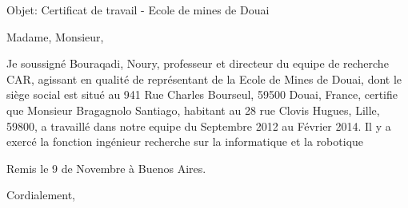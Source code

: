 \documentclass[11pt]{letter} %
\begin{document}

\begin{letter}{} 
\date{}%


\signature{Noury Bouraqadi} %


Objet: Certificat de travail - Ecole de mines de Douai 

\opening{Madame, Monsieur,} 

Je soussigné  Bouraqadi, Noury, professeur et directeur du equipe de recherche CAR, agissant en qualité de représentant de la Ecole de Mines de Douai, dont le siège social est situé au 941 Rue Charles Bourseul, 59500 Douai, France, certifie que Monsieur Bragagnolo Santiago, habitant au 28 rue Clovis Hugues, Lille, 59800, a travaillé dans notre equipe du Septembre 2012 au Février  2014. Il y a  exercé la fonction ingénieur recherche sur la informatique et la robotique 


Remis le 9 de Novembre à Buenos Aires. 


\closing{Cordialement,}




\end{letter}
\end{document}
